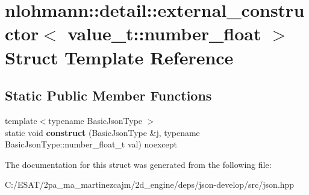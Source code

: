 \hypertarget{structnlohmann_1_1detail_1_1external__constructor_3_01value__t_1_1number__float_01_4}{}\section{nlohmann\+:\+:detail\+:\+:external\+\_\+constructor$<$ value\+\_\+t\+:\+:number\+\_\+float $>$ Struct Template Reference}
\label{structnlohmann_1_1detail_1_1external__constructor_3_01value__t_1_1number__float_01_4}
\subsection*{Static Public Member Functions}
\begin{DoxyCompactItemize}
\item 
\mbox{\label{structnlohmann_1_1detail_1_1external__constructor_3_01value__t_1_1number__float_01_4_a669df5a4d258b588e67f747c6d656cdb}} 
{\footnotesize template$<$typename Basic\+Json\+Type $>$ }\\static void {\bfseries construct} (Basic\+Json\+Type \&j, typename Basic\+Json\+Type\+::number\+\_\+float\+\_\+t val) noexcept
\end{DoxyCompactItemize}


The documentation for this struct was generated from the following file\+:\begin{DoxyCompactItemize}
\item 
C\+:/\+E\+S\+A\+T/2pa\+\_\+ma\+\_\+martinezcajm/2d\+\_\+engine/deps/json-\/develop/src/json.\+hpp\end{DoxyCompactItemize}
